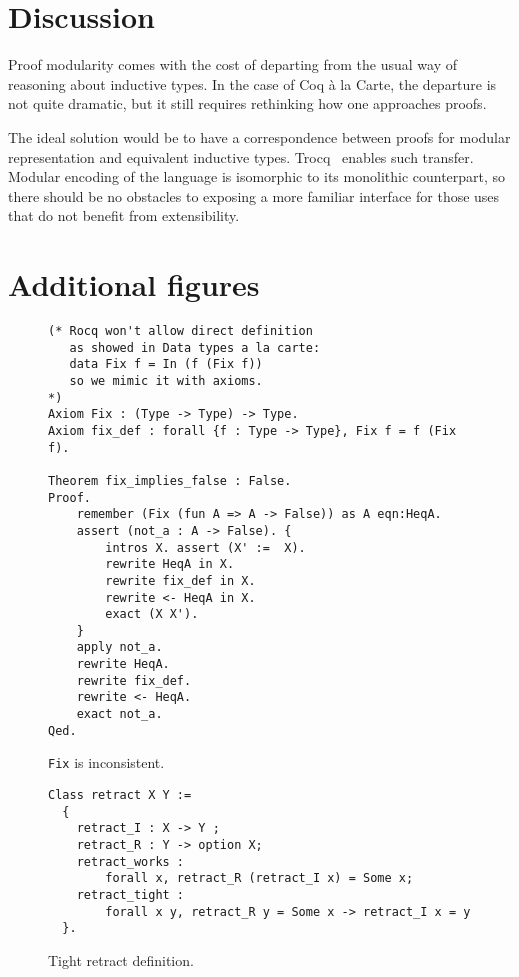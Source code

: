 \documentclass[sigplan,nonacm,review]{acmart}
\begin{document}

\section{Discussion}

Proof modularity comes with the cost of departing from the usual way of reasoning about inductive types. 
In the case of Coq à la Carte, the departure is not quite dramatic, but it still requires rethinking how one approaches proofs.

The ideal solution would be to have a correspondence between proofs for modular representation and equivalent inductive types. Trocq~\cite{cohen2024trocq} enables such transfer. Modular encoding of the language is isomorphic to its monolithic counterpart, so there should be no obstacles to exposing a more familiar interface for those uses that do not benefit from extensibility.





\appendix

\section{Additional figures}
\label{sec:additional-figures}

\begin{figure}[H]
\begin{lstlisting}[language=Coq]
(* Rocq won't allow direct definition
   as showed in Data types a la carte:
   data Fix f = In (f (Fix f))
   so we mimic it with axioms.
*)
Axiom Fix : (Type -> Type) -> Type.
Axiom fix_def : forall {f : Type -> Type}, Fix f = f (Fix f).

Theorem fix_implies_false : False. 
Proof.
    remember (Fix (fun A => A -> False)) as A eqn:HeqA.
    assert (not_a : A -> False). { 
        intros X. assert (X' :=  X).
        rewrite HeqA in X.
        rewrite fix_def in X.
        rewrite <- HeqA in X.
        exact (X X').
    }
    apply not_a.
    rewrite HeqA.
    rewrite fix_def.
    rewrite <- HeqA.
    exact not_a.
Qed.
\end{lstlisting}
\caption{\texttt{Fix} is inconsistent.}
  \label{appendix:false_proof}
\end{figure}

\begin{figure}[H]
\begin{lstlisting}[language=Coq]
Class retract X Y :=
  {
    retract_I : X -> Y ;
    retract_R : Y -> option X;
    retract_works : 
        forall x, retract_R (retract_I x) = Some x;
    retract_tight : 
        forall x y, retract_R y = Some x -> retract_I x = y
  }.
\end{lstlisting}
\caption{Tight retract definition.}
  \label{appendix:tight_retract}
\end{figure}
\end{document}
